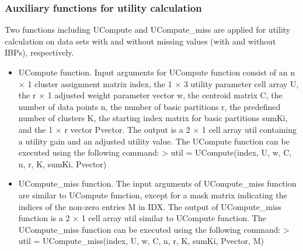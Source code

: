 \documentclass[acmsmall,screen,review]{acmart}
\begin{document}
\subsubsection{Auxiliary functions for utility calculation}
Two functions including \textsf{UCompute} and \textsf{UCompute\_miss} are applied for utility calculation on data sets with and without missing values (with and without IBPs), respectively. 
\begin{itemize}
\item \textsf{UCompute} function. Input arguments for \textsf{UCompute} function consist of an \textsf{n} $\times$ \textsf{1} cluster assignment matrix \textsf{index}, the \textsf{1} $\times$ \textsf{3} utility parameter cell array \textsf{U}, the \textsf{r} $\times$ \textsf{1} adjusted weight parameter vector \textsf{w}, the centroid matrix \textsf{C}, the number of data points \textsf{n}, the number of basic partitions \textsf{r}, the predefined number of clusters \textsf{K}, the starting index matrix for basic partitions \textsf{sumKi}, and the \textsf{1} $\times$ \textsf{r} vector \textsf{Pvector}. The output is a \textsf{2} $\times$ \textsf{1} cell array \textsf{util} containing a utility gain and an adjusted utility value. The \textsf{UCompute} function can be executed using the following command:
\newline
\newline
\textsf{> util = UCompute(index, U, w, C, n, r, K, sumKi, Pvector)}
\newline
\item \textsf{UCompute\_miss} function. The input arguments of \textsf{UCompute\_miss} function are similar to \textsf{UCompute} function, except for a mask matrix indicating the indices of the non-zero entries \textsf{M} in \textsf{IDX}. The output of \textsf{UCompute\_miss} function is a \textsf{2} $\times$ \textsf{1} cell array \textsf{util} similar to \textsf{UCompute} function. The \textsf{UCompute\_miss} function can be executed using the following command:
\newline
\newline
\textsf{> util = UCompute\_miss(index, U, w, C, n, r, K, sumKi, Pvector, M)}
\end{itemize}
\end{document}
